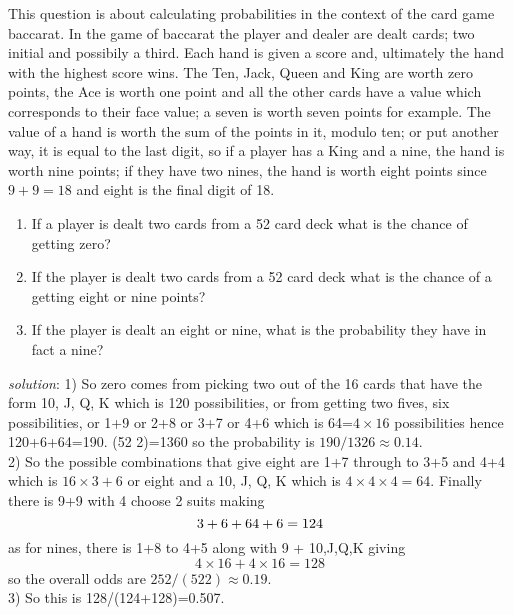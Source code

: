 \documentclass[11pt,a4paper]{scrartcl}
\begin{document}
This question is about calculating probabilities in the
context of the card game baccarat. In the game of baccarat the player
and dealer are dealt cards; two initial and possibily a third. Each
hand is given a score and, ultimately the hand with the highest score
wins. The Ten, Jack, Queen and King are worth zero points, the Ace is
worth one point and all the other cards have a value which corresponds
to their face value; a seven is worth seven points for example. The
value of a hand is worth the sum of the points in it, modulo ten; or
put another way, it is equal to the last digit, so if a player has a
King and a nine, the hand is worth nine points; if they have two
nines, the hand is worth eight points since $9+9=18$ and eight is the
final digit of 18.
\begin{enumerate}
  \item If a player is dealt two cards from a 52 card deck what is the chance of getting zero?
  \item If the player is dealt two cards from a 52 card deck what is the chance of a getting eight or nine points?
  \item If the player is dealt an eight or nine, what is the probability they have in fact a nine?
\end{enumerate}
\textsl{solution}: 
  1) So zero comes from picking two out of the 16 cards that have the
  form 10, J, Q, K which is 120 possibilities, or from getting two
  fives, six possibilities, or 1+9 or 2+8 or 3+7 or 4+6 which is
  64=$4\times 16$ possibilities hence 120+6+64=190. (52 2)=1360 so the
  probability is $190/1326\approx 0.14$.\\
  2) So the possible combinations that give eight are 1+7 through to 3+5
  and 4+4 which is $16\times 3+6$ or eight and a 10, J, Q, K which is $4\times 4\times 4=64$. Finally there is 9+9 with 4 choose 2 suits making
  \begin{equation}
    3\time 16 + 6+64 + 6=124
  \end{equation}
  as for nines, there is 1+8 to 4+5 along with 9 + 10,J,Q,K giving
  \begin{equation}
    4\times 16+4\times 16 =128
  \end{equation}
  so the overall odds are $252/(52 2) \approx 0.19$.\\ 
  3) So this is 128/(124+128)=0.507.
\end{document}
